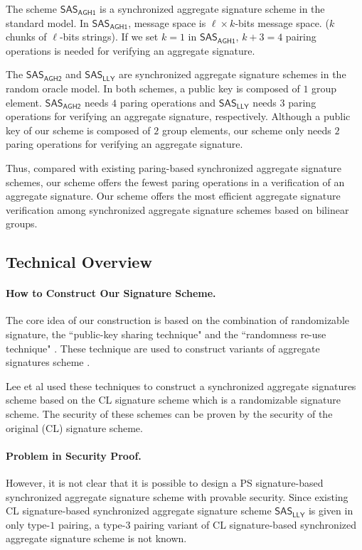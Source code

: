 \documentclass[a4paper,11pt]{fullverllncs}
\newcommand{\AGHo}{\mathsf{AGH1}}
\newcommand{\AGHt}{\mathsf{AGH2}}
\newcommand{\LLY}{\mathsf{LLY}}
\newcommand{\SAS}{\mathsf{SAS}}
\begin{document}
The scheme $\SAS_{\AGHo}$ \cite{AGH10} is a synchronized aggregate signature scheme in the standard model.
In $\SAS_{\AGHo}$, message space is $\ell \times k$-bits message space. ($k$ chunks of $\ell$-bits strings).
If we set $k=1$ in $\SAS_{\AGHo}$, $k+3 = 4$ pairing operations is needed for verifying an aggregate signature.

The  $\SAS_{\AGHt}$ \cite{AGH10}  and  $\SAS_{\LLY}$ \cite{LLY13} are synchronized aggregate signature schemes in the random oracle model.
In both schemes, a public key is composed of $1$ group element.
 $\SAS_{\AGHt}$ needs $4$ paring operations and $\SAS_{\LLY}$  needs $3$ paring operations for verifying an aggregate signature, respectively.
Although a public key of our scheme is composed of $2$ group elements, our scheme only needs $2$ paring operations for verifying an aggregate signature.

Thus, compared with existing paring-based synchronized aggregate signature schemes, our scheme offers the fewest paring operations in a verification of an aggregate signature.
Our scheme offers the most efficient aggregate signature verification among synchronized aggregate signature schemes based on bilinear groups.

\subsection{Technical Overview}\label{TechOverview}
\paragraph{\bf How to Construct Our Signature Scheme.}
The core idea of our construction is based on the combination of randomizable signature, the ``public-key sharing technique" and the ``randomness re-use technique" \cite{LOSSW06}.
These technique are used to construct variants of aggregate signatures scheme \cite{LOSSW06,Sch11,LLY13,CK20}. 

Lee et al \cite{LLY13} used these techniques to construct a synchronized aggregate signatures scheme based on the CL signature scheme which is a randomizable signature scheme.
The security of these schemes can be proven by the security of the original (CL) signature scheme.

\paragraph{\bf Problem in Security Proof.}
However, it is not clear that it is possible to design a PS signature-based synchronized aggregate signature scheme with provable security.
Since existing CL signature-based synchronized aggregate signature scheme  $\SAS_{\LLY}$ \cite{LLY13}  is given in only type-$1$ pairing, a type-$3$ pairing variant of CL signature-based synchronized aggregate signature scheme is not known.
\end{document}
